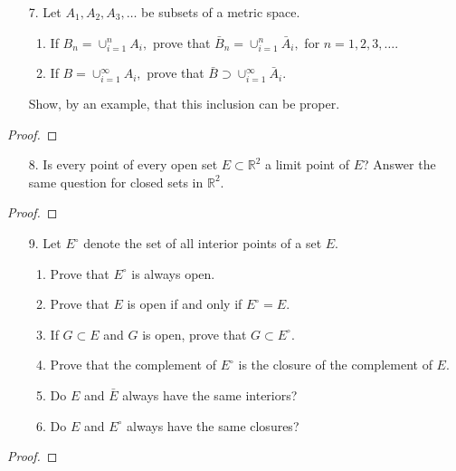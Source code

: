 \documentclass[10pt]{article}
\theoremstyle{definition}
\theoremstyle{plain}
\newcommand{\R}{\mathbb{R}}
\begin{document}
\pagebreak



\begin{enumerate}
\item[7.] Let $A_1,A_2,A_3,\dots$ be subsets of a metric space.
\begin{enumerate}
  \item If $B_n = \cup_{i=1}^{n} A_i,$ prove that $\bar{B}_n = \cup_{i=1}^{n} \bar{A}_i,$ for $n=1,2,3,\dots$.
  \item If $B = \cup_{i=1}^{\infty} A_i,$ prove that $\bar{B} \supset \cup_{i=1}^{\infty} \bar{A}_i.$
\end{enumerate}
Show, by an example, that this inclusion can be proper.
\end{enumerate}

\begin{proof}

\end{proof}



\pagebreak



\begin{enumerate}
\item[8.] Is every point of every open set $E \subset \R^2$ a limit point of $E$? Answer the same question for closed sets in $\R^2$.
\end{enumerate}

\begin{proof}

\end{proof}




\pagebreak




\begin{enumerate}
\item[9.] Let $E^\circ$ denote the set of all interior points of a set $E$.
\begin{enumerate}
  \item Prove that $E^\circ$ is always open.
  \item Prove that $E$ is open if and only if $E^\circ = E$.
  \item If $G \subset E$ and $G$ is open, prove that $G\subset E^\circ$.
  \item Prove that the complement of $E^\circ$ is the closure of the complement of $E$.
  \item Do $E$ and $\bar{E}$ always have the same interiors?
  \item Do $E$ and $E^\circ$ always have the same closures?
\end{enumerate}
\end{enumerate}

\begin{proof}

\end{proof}
\end{document}
